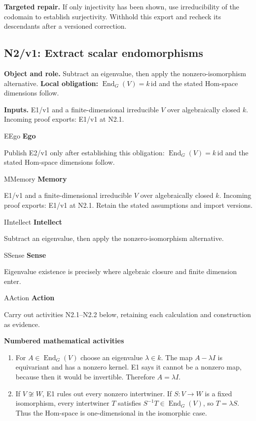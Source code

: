 \documentclass[preprint,12pt,aps,pra,showkeys,amsmath,amssymb,superscriptaddress,floatfix]{revtex4-2}
\theoremstyle{definition}
\theoremstyle{remark}
\newcommand{\mmfaculty}[3]{%
 \begin{mmfacultybox}{#1}{#2}
 {\sffamily\bfseries\color{MMBlue}#2}\par\smallskip #3
 \end{mmfacultybox}}
\newcommand{\field}[2]{\par\smallskip\noindent\textbf{#1.} #2\par}
\begin{document}
\field{Targeted repair}{If only injectivity has been shown, use irreducibility of the codomain
to establish surjectivity. Withhold this export and recheck its
descendants after a versioned correction.}

\clearpage

\subsection{N2/v1: Extract scalar endomorphisms}

\field{Object and role}{Subtract an eigenvalue, then apply the nonzero-isomorphism alternative.
\textbf{Local obligation:} \(\operatorname{End}_G(V)=k\,\mathrm{id}\)
and the stated Hom-space dimensions follow.}

\field{Inputs}{E1/v1 and a finite-dimensional irreducible \(V\) over algebraically
closed \(k\). Incoming proof exports: E1/v1 at N2.1.}

\mmfaculty{E}{Ego}{Publish E2/v1 only after establishing this obligation:
\(\operatorname{End}_G(V)=k\,\mathrm{id}\) and the stated Hom-space
dimensions follow.}

\mmfaculty{M}{Memory}{E1/v1 and a finite-dimensional irreducible \(V\) over algebraically
closed \(k\). Incoming proof exports: E1/v1 at N2.1. Retain the stated
assumptions and import versions.}

\mmfaculty{I}{Intellect}{Subtract an eigenvalue, then apply the nonzero-isomorphism alternative.}

\mmfaculty{S}{Sense}{Eigenvalue existence is precisely where algebraic closure and finite
dimension enter.}

\mmfaculty{A}{Action}{Carry out activities N2.1--N2.2 below, retaining each calculation and
construction as evidence.}

\smallskip\noindent\textbf{Numbered mathematical activities}

\begin{enumerate}[label=N2.\arabic*,leftmargin=3.4em]

\item For \(A\in\operatorname{End}_G(V)\) choose an eigenvalue
\(\lambda\in k\). The map \(A-\lambda I\) is equivariant and has a
nonzero kernel. E1 says it cannot be a nonzero map, because then it
would be invertible. Therefore \(A=\lambda I\).

\item If \(V\not\cong W\), E1 rules out every nonzero intertwiner. If
\(S:V\to W\) is a fixed isomorphism, every intertwiner \(T\) satisfies
\(S^{-1}T\in\operatorname{End}_G(V)\), so \(T=\lambda S\). Thus the
Hom-space is one-dimensional in the isomorphic case.

\end{enumerate}
\end{document}
